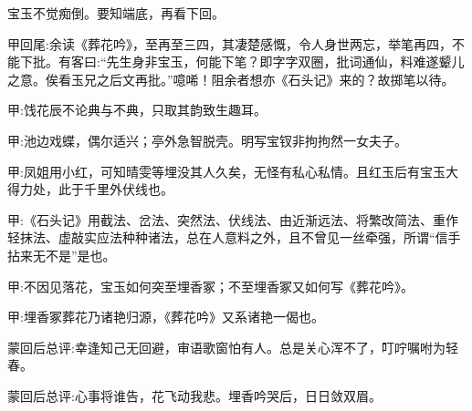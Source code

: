 \begin{parag}
    宝玉不觉痴倒。要知端底，再看下回。
\end{parag}


\begin{parag}
    \begin{note}甲回尾:余读《葬花吟》，至再至三四，其凄楚感慨，令人身世两忘，举笔再四，不能下批。有客曰:“先生身非宝玉，何能下笔？即字字双圈，批词通仙，料难遂颦儿之意。俟看玉兄之后文再批。”噫唏！阻余者想亦《石头记》来的？故掷笔以待。\end{note}
\end{parag}


\begin{parag}
    \begin{note}甲:饯花辰不论典与不典，只取其韵致生趣耳。\end{note}
\end{parag}


\begin{parag}
    \begin{note}甲:池边戏蝶，偶尔适兴；亭外急智脱壳。明写宝钗非拘拘然一女夫子。\end{note}
\end{parag}


\begin{parag}
    \begin{note}甲:凤姐用小红，可知晴雯等埋没其人久矣，无怪有私心私情。且红玉后有宝玉大得力处，此于千里外伏线也。\end{note}
\end{parag}


\begin{parag}
    \begin{note}甲:《石头记》用截法、岔法、突然法、伏线法、由近渐远法、将繁改简法、重作轻抹法、虚敲实应法种种诸法，总在人意料之外，且不曾见一丝牵强，所谓“信手拈来无不是”是也。\end{note}
\end{parag}


\begin{parag}
    \begin{note}甲:不因见落花，宝玉如何突至埋香冢；不至埋香冢又如何写《葬花吟》。\end{note}
\end{parag}


\begin{parag}
    \begin{note}甲:埋香冢葬花乃诸艳归源，《葬花吟》又系诸艳一偈也。\end{note}
\end{parag}


\begin{parag}
    \begin{note}蒙回后总评:幸逢知己无回避，审语歌窗怕有人。总是关心浑不了，叮咛嘱咐为轻春。\end{note}
\end{parag}


\begin{parag}
    \begin{note}蒙回后总评:心事将谁告，花飞动我悲。埋香吟哭后，日日敛双眉。\end{note}
\end{parag}

